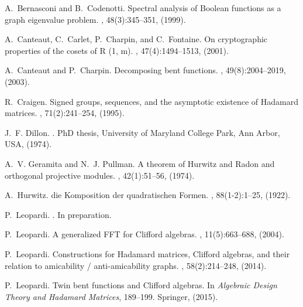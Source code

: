 \documentclass[11pt,a4paper]{jacodesmath}
\begin{document}
\begin{thebibliography}{20}

A.~Bernasconi and B.~Codenotti.
\newblock Spectral analysis of {Boolean} functions as a graph eigenvalue
  problem.
, 48(3):345--351, (1999).

A.~Canteaut, C.~Carlet, P.~Charpin, and C.~Fontaine.
\newblock On cryptographic properties of the cosets of {R (1, m)}.
, 47(4):1494--1513,
  (2001).

A.~Canteaut and P.~Charpin.
\newblock Decomposing bent functions.
, 49(8):2004--2019,
  (2003).

R.~Craigen.
\newblock Signed groups, sequences, and the asymptotic existence of {Hadamard}
  matrices.
, 71(2):241--254, (1995).

J.~F. Dillon.
.
\newblock PhD thesis, University of Maryland College Park, Ann Arbor, USA,
  (1974).

A.~V. Geramita and N.~J. Pullman.
\newblock A theorem of {Hurwitz and Radon} and orthogonal projective modules.
, 42(1):51--56,
  (1974).

A.~Hurwitz.
 die {Komposition} der quadratischen {Formen}.
, 88(1-2):1--25, (1922).

P.~Leopardi.
.
\newblock In preparation.

P.~Leopardi.
\newblock A generalized {FFT} for {Clifford} algebras.
,
  11(5):663--688, (2004).

P.~Leopardi.
\newblock Constructions for {Hadamard} matrices, {Clifford} algebras, and their
  relation to amicability / anti-amicability graphs.
, 58(2):214--248, (2014).

P.~Leopardi.
\newblock Twin bent functions and {Clifford} algebras.
\newblock In {\em Algebraic Design Theory and Hadamard Matrices},  189--199.
  Springer, (2015).


\end{thebibliography}
\end{document}
